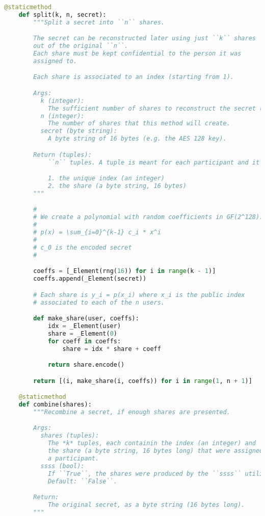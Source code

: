 \begin{lstlisting}[language = Python]
    @staticmethod
    def split(k, n, secret):
        """Split a secret into ``n`` shares.

        The secret can be reconstructed later using just ``k`` shares
        out of the original ``n``.
        Each share must be kept confidential to the person it was
        assigned to.

        Each share is associated to an index (starting from 1).

        Args:
          k (integer):
            The sufficient number of shares to reconstruct the secret (``k < n``).
          n (integer):
            The number of shares that this method will create.
          secret (byte string):
            A byte string of 16 bytes (e.g. the AES 128 key).

        Return (tuples):
            ``n`` tuples. A tuple is meant for each participant and it contains two items:

            1. the unique index (an integer)
            2. the share (a byte string, 16 bytes)
        """

        #
        # We create a polynomial with random coefficients in GF(2^128):
        #
        # p(x) = \sum_{i=0}^{k-1} c_i * x^i
        #
        # c_0 is the encoded secret
        #

        coeffs = [_Element(rng(16)) for i in range(k - 1)]
        coeffs.append(_Element(secret))

        # Each share is y_i = p(x_i) where x_i is the public index
        # associated to each of the n users.

        def make_share(user, coeffs):
            idx = _Element(user)
            share = _Element(0)
            for coeff in coeffs:
                share = idx * share + coeff

            return share.encode()

        return [(i, make_share(i, coeffs)) for i in range(1, n + 1)]

    @staticmethod
    def combine(shares):
        """Recombine a secret, if enough shares are presented.

        Args:
          shares (tuples):
            The *k* tuples, each containin the index (an integer) and
            the share (a byte string, 16 bytes long) that were assigned to
            a participant.
          ssss (bool):
            If ``True``, the shares were produced by the ``ssss`` utility.
            Default: ``False``.

        Return:
            The original secret, as a byte string (16 bytes long).
        """


\end{lstlisting}
